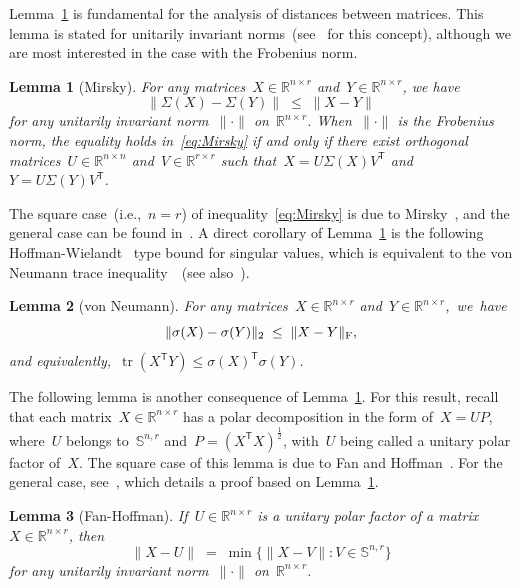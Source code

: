 \documentclass[11pt,a4paper]{article}  %
\newtheorem{lemma}{Lemma}%
\theoremstyle{definition}
\DeclareMathOperator{\tr}{tr}
\newcommand{\RR}{\mathbb{R}}
\newcommand{\col}{r}
\newcommand{\stf}[1]{\mathbb{S}^{#1}}
\newcommand{\fro}{{\scriptstyle{\textnormal{F}}}}
\newcommand{\trs}{{\scriptstyle{\mathsf{T}}}}
\newcommand{\ie}{{i.e.}}
\begin{document}
Lemma~\ref{lem:Mirsky} is fundamental for the analysis of distances between matrices.
This lemma is stated for unitarily invariant norms~(see~\cite[Section~3.5]{Horn_Johnson_2008}
for this concept), although we are most interested in the case with the Frobenius norm.

\begin{lemma}
    [Mirsky]
    \label{lem:Mirsky}
    For any matrices~$X \in \RR^{n\times \col}$ and~$Y\in\RR^{n\times \col}$, we have
    \begin{equation}
     \label{eq:Mirsky}
    \|\Sigma(X) - \Sigma(Y)\| \;\le\; \|X-Y\|
    \end{equation}
    for any unitarily invariant norm~$\|\cdot\|$
    on~$\RR^{n\times \col}$.
    When~$\|\cdot\|$ is the Frobenius norm, the equality holds in~\eqref{eq:Mirsky}
    if and only if there exist orthogonal matrices~$U\in\RR^{n\times n}$ and~$V \in \RR^{\col \times
    \col}$ such that~$X = U\Sigma(X) V^\trs$ and~$Y = U\Sigma(Y)V^\trs$.
\end{lemma}

The square case~(\ie,~$n = \col$) of inequality~\eqref{eq:Mirsky} is due to
Mirsky~\cite[Theorem~5]{Mirsky_1960}, and the general case can be found in~\cite[Theorem
7.4.9.1]{Horn_Johnson_2012}.
A direct corollary of Lemma~\ref{lem:Mirsky} is the following
Hoffman-Wielandt~\cite{Hoffman_Wielandt_2003} type bound for singular values, which is equivalent to
the von Neumann trace inequality~\cite[Theorem~I]{vonNeumann_1937}~(see also~\cite[Theorem~2.1]{Lewis_1995}).
\begin{lemma}[von Neumann]
    \label{lem:vonNeumann}
    For any matrices~$X \in \RR^{n\times \col}$ and~$Y\in\RR^{n\times \col}$,~we~have%
    \begin{equation}
        \nonumber
    \|\sigma(X) - \sigma(Y)\|_2  \;\le\; \|X-Y\|_\fro,
    \end{equation}
    and equivalently,~$\tr(X^\trs Y) \le \sigma(X)^\trs \sigma(Y)$.
\end{lemma}


The following lemma is another consequence of Lemma~\ref{lem:Mirsky}.
For this result, recall that each matrix~$X\in\RR^{n\times \col}$ has a polar decomposition in the
form of~$X = UP$, where~$U$ belongs to~$\stf{n,\col}$ and~$P=(X^\trs X)^{\frac{1}{2}}$,
with~$U$ being called a unitary polar factor of~$X$.
The square case of this lemma is due to Fan and Hoffman~\cite[Theorem~1]{Fan_Hoffman_1955}.
For the general case, see~\mbox{\cite[Theorem~8.4]{Higham_2008}},
which details a proof based on Lemma~\ref{lem:Mirsky}.%
\begin{lemma}[Fan-Hoffman]\label{lem:FanHoffman}%
    If~$U\in\RR^{n\times \col}$ is a unitary polar factor of a matrix~$X \in\RR^{n\times \col}$, then%
    \begin{equation}
        \nonumber
        \|X - U\| \;=\; \min\{\|X-V\|\mathrel{:} V\in\stf{n,\col}\}
    \end{equation}
    for any unitarily invariant norm~$\|\cdot\|$ on~$\RR^{n\times \col}$.
\end{lemma}
\end{document}
